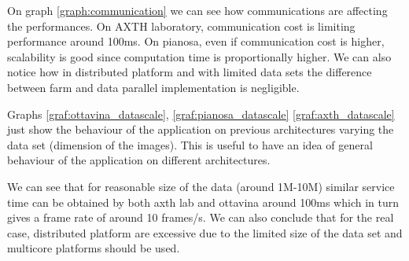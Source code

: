 On graph \ref{graph:communication} we can see how communications are affecting the performances.
On AXTH laboratory, communication cost is limiting performance around 100ms.
On pianosa, even if communication cost is higher, scalability is good since computation time is proportionally higher.
We can also notice how in distributed platform and with limited data sets the difference between farm and data parallel implementation is negligible.

Graphs \ref{graf:ottavina_datascale}, \ref{graf:pianosa_datascale} \ref{graf:axth_datascale} just show the behaviour of the application on previous architectures varying the data set (dimension of the images). 
This is useful to have an idea of general behaviour of the application on different architectures.

We can see that for reasonable size of the data (around 1M-10M) similar service time can be obtained by both axth lab and ottavina around 100ms which in turn gives a frame rate of around 10 frames/s.
We can also conclude that for the real case, distributed platform are excessive due to the limited size of the data set and multicore platforms should be used.
